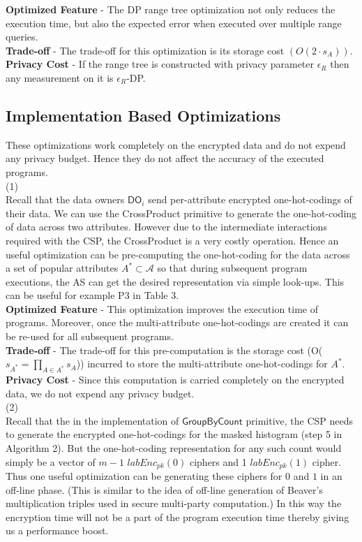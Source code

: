\textbf{Optimized Feature} - The DP range tree optimization not only reduces the execution time, but also the expected error when executed over multiple range queries.\\\textbf{Trade-off} - The trade-off for this optimization is its storage cost $(O(2\cdot s_A))$.\\\textbf{Privacy Cost} - If the range tree is constructed  with privacy parameter $\epsilon_R$ then any measurement on it is $\epsilon_R$-DP.
\subsection*{Implementation Based Optimizations}
These optimizations work completely on the encrypted data and do not expend any privacy budget. Hence they do not affect the accuracy of the executed programs.\\
(1)  \\
Recall that the data owners $\textsf{DO}_i$ send per-attribute encrypted one-hot-codings of their data. We can use the \textsf{CrossProduct} primitive to generate the one-hot-coding of data across two attributes. However due to the intermediate interactions required with the \textsf{CSP}, the \textsf{CrossProduct} is a very costly operation. Hence an  useful optimization can be pre-computing the one-hot-coding for the data across a set of popular attributes $A^* \subset \mathcal{A}$ so that during subsequent program executions, the \textsf{AS} can get the desired representation via simple look-ups.  This can be useful for example P3 in Table 3.\\
\textbf{Optimized Feature} - This optimization improves the execution time of \system programs. Moreover, once the multi-attribute one-hot-codings are created it can be re-used for all subsequent programs.\\
\textbf{Trade-off} - The trade-off for this pre-computation is the storage cost (O($s_{A^*}=\prod_{A \in A^*}s_A$)) incurred to store the multi-attribute one-hot-codings for $A^*$.\\
\textbf{Privacy Cost} - Since this computation is carried completely on the encrypted data, we do not expend any privacy budget.\\
(2)\\
Recall that the in the implementation of $\textsf{GroupByCount}$ primitive, the \textsf{CSP} needs to generate the encrypted one-hot-codings for the masked histogram (step 5 in Algorithm 2). But the one-hot-coding representation for any such count would simply be a vector of $m-1$ $labEnc_{pk}(0)$ ciphers and 1 $labEnc_{pk}(1)$ cipher. Thus one useful optimization can be generating these ciphers for $0$ and $1$ in an off-line phase. (This is similar to the idea of off-line generation of Beaver's multiplication triples \cite{Beaver} used in secure multi-party computation.) In this way the encryption time will not be a part of the program execution time thereby giving us a performance boost.\\
